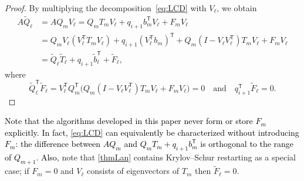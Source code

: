 \documentclass{siamart190516}
\newcommand{\Ttran}{\mathsf{T}}
\providecommand{\edit}[1]{\textcolor{black}{#1}}
\begin{document}
\begin{proof}
    By multiplying the decomposition~\cref{eq:LCD} with $V_\ell$, we obtain
    \begin{equation*}
        \begin{aligned}
            A\widetilde{Q}_{\ell} &= AQ_{m}V_{\ell}=Q_{m}T_{m}V_{\ell}+q_{i+1}b_{m}^{\Ttran}V_{\ell}+F_{m}V_{\ell}\\ 
            &=Q_{m}V_{\ell}(V_{\ell}^{\Ttran}T_{m}V_{\ell})+q_{i+1}(V_{\ell}^{\Ttran}b_{m})^{\Ttran}+Q_{m}(I-V_{\ell}V_{\ell}^{\Ttran})T_{m}V_{\ell}+F_{m}V_{\ell}\\ 
            &=\widetilde{Q}_{\ell}\widetilde{T}_{\ell}+q_{i+1}\widetilde{b}_{\ell}^{\Ttran}+\widetilde{F}_{\ell},
        \end{aligned}
    \end{equation*}
    where 
    \begin{equation*}
        \widetilde{Q}_{\ell}^{\Ttran}\widetilde{F}_{\ell} =
            V_{\ell}^{\Ttran}Q_{m}^{\Ttran}\bigl(Q_{m}(I-V_{\ell}V_{\ell}^{\Ttran})T_{m}V_{\ell}+F_{m}V_{\ell}\bigr)=0
            \quad\text{and}\quad q_{i+1}^{\Ttran}\widetilde{F}_{\ell}=0.
    \end{equation*}
\end{proof}

\edit{Note that the algorithms developed in this paper never form or store $F_m$ explicitly. In fact,
\eqref{eq:LCD} can equivalently be characterized without introducing $F_m$:
the difference between $AQ_{m}$ and $Q_{m}T_{m}+q_{i+1}b_{m}^{\Ttran}$ is orthogonal to the range of $Q_{m+1}$.
Also,}
note that \cref{thmLan} contains Krylov--Schur restarting as a special case; if $F_{m} = 0$ and $V_\ell$ consists of eigenvectors of $T_m$ then $\widetilde{F}_\ell = 0$. 
\end{document}
